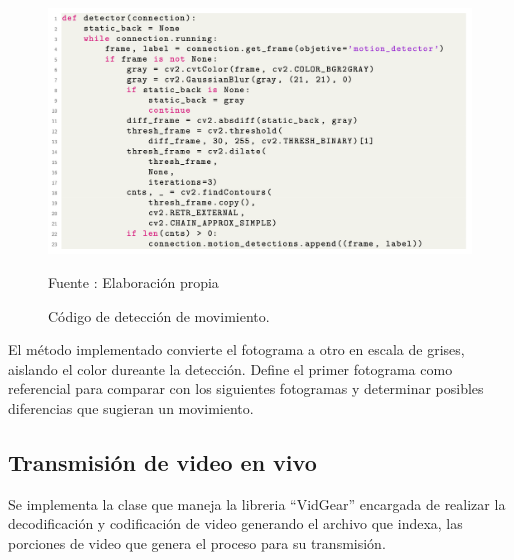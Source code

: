 \begin{figure}[H]
    \begin{center}
        \includegraphics[width=16cm]{img/capitulo_5/motion_detector.png}
    \end{center}
    \begin{center}
        \caption{Código de detección de movimiento.}
        Fuente : Elaboración propia
        \label{fig:motion_detector}
    \end{center}
\end{figure}

El método implementado convierte el fotograma a otro en escala de grises, aislando el color dureante la detección. Define el primer fotograma como referencial para comparar con los siguientes fotogramas y determinar posibles diferencias que sugieran un movimiento.\\ 
\subsection{Transmisión de video en vivo}
Se implementa la clase que maneja la libreria ``VidGear'' encargada de realizar la decodificación y codificación de video generando el archivo que indexa, las porciones de video que genera el proceso para su transmisión.